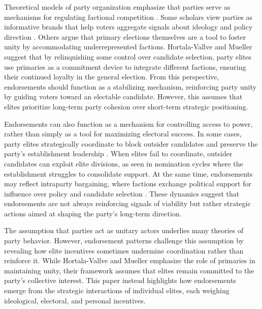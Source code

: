 Theoretical models of party organization emphasize that parties serve as mechanisms for regulating factional competition \parencite{Caillaud2002}. Some scholars view parties as informative brands that help voters aggregate signals about ideology and policy direction \parencite{Snyder2002}. Others argue that primary elections themselves are a tool to foster unity by accommodating underrepresented factions. Hortala-Vallve and Mueller \parencite*{Hortala2015} suggest that by relinquishing some control over candidate selection, party elites use primaries as a commitment device to integrate different factions, ensuring their continued loyalty in the general election. From this perspective, endorsements should function as a stabilizing mechanism, reinforcing party unity by guiding voters toward an electable candidate. However, this assumes that elites prioritize long-term party cohesion over short-term strategic positioning.

Endorsements can also function as a mechanism for controlling access to power, rather than simply as a tool for maximizing electoral success. In some cases, party elites strategically coordinate to block outsider candidates and preserve the party’s establishment leadership \parencite{Buisseret2020}. When elites fail to coordinate, outsider candidates can exploit elite divisions, as seen in nomination cycles where the establishment struggles to consolidate support. At the same time, endorsements may reflect intraparty bargaining, where factions exchange political support for influence over policy and candidate selection \parencite{Persico2011}. These dynamics suggest that endorsements are not always reinforcing signals of viability but rather strategic actions aimed at shaping the party’s long-term direction.

The assumption that parties act as unitary actors underlies many theories of party behavior. However, endorsement patterns challenge this assumption by revealing how elite incentives sometimes undermine coordination rather than reinforce it. While Hortala-Vallve and Mueller \parencite*{Hortala2015} emphasize the role of primaries in maintaining unity, their framework assumes that elites remain committed to the party’s collective interest. This paper instead highlights how endorsements emerge from the strategic interactions of individual elites, each weighing ideological, electoral, and personal incentives.
